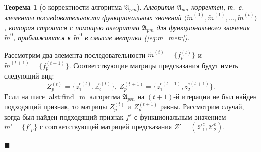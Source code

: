 \documentclass[a4paper, 12pt]{article}
\theoremstyle{plain}
\newtheorem{Theorem}{Теорема}
\newenvironment{Proof}%
	{\par\noindent{\bf Доказательство.}}%
	{\hfill$\scriptstyle\blacksquare$}
\begin{document}
	\begin{Theorem}[о корректности алгоритма $\mathfrak A_{pm}$]
		Алгоритм $\mathfrak A_{pm}$ корректен, т.~е. элементы последовательности функциональных значений $\langle\tilde m^{(0)},\tilde m^{(1)},\dots,\tilde m^{(t)}\rangle$, которая строится с помощью алгоритма $\mathfrak A_{pm}$ для функционального значения $\tilde m^0$, приближаются к $\tilde m^0$ в смысле метрики (\ref{eq:m_metr}).
	\end{Theorem}
	
	\begin{Proof}
		Рассмотрим два элемента последовательности $\tilde m^{(t)}=\{f_p^{(t)}\}$ и $\tilde m^{(t+1)}=\{f_p^{(t+1)}\}$. Соответствующие матрицы предсказания будут иметь следующий вид:
		\begin{equation}
		Z_p^{(t)}=\{\bar z_1^{c(t)},\bar z_2^{e(t)}\},\ Z_p^{(t+1)}=\{\bar z_1^{c(t+1)},\bar z_2^{e(t+1)}\}.
		\end{equation}
		Если на шаге \ref{alst:find_m} алгоритма $\mathfrak A_{pm}$ на $(t+1)$-й итерации не был найден подходящий признак, то матрицы $Z_p^{(t)}$ и $Z_p^{(t+1)}$ равны. Рассмотрим случай, когда был найден подходящий признак $f'$ с функциональным значением $\tilde m'=\{f'_p\}$ с соответствующей матрицей предсказания $Z'=(\bar z'^c_1,\bar z'^e_2)$.
		

\end{Proof}
\end{document}
